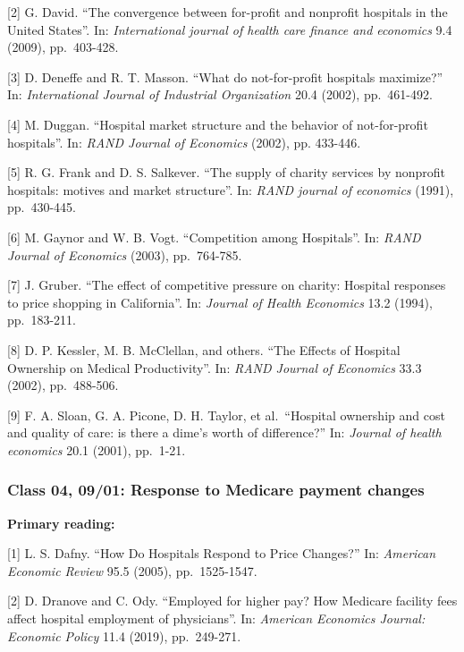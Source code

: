 \documentclass[11pt,]{article}
\begin{document}
{[}2{]} G. David. ``The convergence between for-profit and nonprofit
hospitals in the United States''. In: \emph{International journal of
health care finance and economics} 9.4 (2009), pp.~403-428.

{[}3{]} D. Deneffe and R. T. Masson. ``What do not-for-profit hospitals
maximize?'' In: \emph{International Journal of Industrial Organization}
20.4 (2002), pp.~461-492.

{[}4{]} M. Duggan. ``Hospital market structure and the behavior of
not-for-profit hospitals''. In: \emph{RAND Journal of Economics} (2002),
pp. 433-446.

{[}5{]} R. G. Frank and D. S. Salkever. ``The supply of charity services
by nonprofit hospitals: motives and market structure''. In: \emph{RAND
journal of economics} (1991), pp.~430-445.

{[}6{]} M. Gaynor and W. B. Vogt. ``Competition among Hospitals''. In:
\emph{RAND Journal of Economics} (2003), pp.~764-785.

{[}7{]} J. Gruber. ``The effect of competitive pressure on charity:
Hospital responses to price shopping in California''. In: \emph{Journal
of Health Economics} 13.2 (1994), pp.~183-211.

{[}8{]} D. P. Kessler, M. B. McClellan, and others. ``The Effects of
Hospital Ownership on Medical Productivity''. In: \emph{RAND Journal of
Economics} 33.3 (2002), pp.~488-506.

{[}9{]} F. A. Sloan, G. A. Picone, D. H. Taylor, et al.~``Hospital
ownership and cost and quality of care: is there a dime's worth of
difference?'' In: \emph{Journal of health economics} 20.1 (2001),
pp.~1-21.

\hypertarget{class-04-0901-response-to-medicare-payment-changes}{%
\subsubsection{Class 04, 09/01: Response to Medicare payment
changes}\label{class-04-0901-response-to-medicare-payment-changes}}

\textbf{Primary reading:}

{[}1{]} L. S. Dafny. ``How Do Hospitals Respond to Price Changes?'' In:
\emph{American Economic Review} 95.5 (2005), pp.~1525-1547.

{[}2{]} D. Dranove and C. Ody. ``Employed for higher pay? How Medicare
facility fees affect hospital employment of physicians''. In:
\emph{American Economics Journal: Economic Policy} 11.4 (2019),
pp.~249-271.
\end{document}
